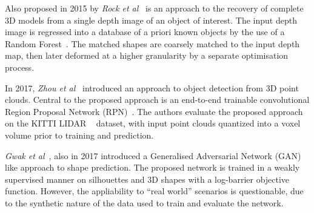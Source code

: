 Also proposed in 2015 by \textit{Rock et al}~\cite{Rock2015} is an approach to the recovery of complete 
3D models from a single depth image of an object of interest. The input depth image is regressed into a 
database of a priori known objects by the use of a Random Forest~\cite{Ho1995}. The matched shapes are 
coarsely matched to the input depth map, then later deformed at a higher granularity by a separate 
optimisation process.

In 2017, \textit{Zhou et al}~\cite{Zhou2017} introduced an approach to object detection from 3D point 
clouds. Central to the proposed approach is an end-to-end trainable convolutional Region Proposal 
Network (RPN)~\cite{Girshick2015_2}. The authors evaluate the proposed approach on the KITTI LIDAR 
~\cite{Geiger2013} dataset, with input point clouds quantized into a voxel volume prior to training 
and prediction.

\textit{Gwak et al}~\cite{Gwak2017}, also in 2017 introduced a Generalised Adversarial Network 
(GAN)~\cite{Goodfellow2014} like approach to shape prediction. The proposed network is trained in a 
weakly supervised manner on silhouettes and 3D shapes with a log-barrier objective function. 
However, the appliability to ``real world'' scenarios is questionable, due to the synthetic nature of 
the data used to train and evaluate the network.
